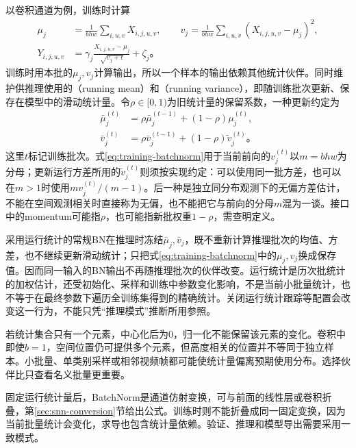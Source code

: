 以卷积通道为例，训练时计算
\begin{equation}
  \begin{aligned}
  \mu_j&=\frac1{bhw}\sum_{i,u,v}X_{i,j,u,v},\qquad
  v_j=\frac1{bhw}\sum_{i,u,v}(X_{i,j,u,v}-\mu_j)^2,\\
  Y_{i,j,u,v}&=\gamma_j\frac{X_{i,j,u,v}-\mu_j}{\sqrt{v_j+\epsilon}}+\zeta_j\text{。}
  \end{aligned}
  \label{eq:training-batchnorm}
\end{equation}
训练时用本批的$\mu_j,v_j$计算输出，所以一个样本的输出依赖其他统计伙伴。同时维护供推理使用的（running mean）和（running variance），即随训练批次更新、保存在模型中的滑动统计量。令$\rho\in[0,1)$为旧统计量的保留系数，一种更新约定为
\begin{equation}
  \begin{aligned}
    \bar\mu_j^{(t)}&=\rho\bar\mu_j^{(t-1)}+(1-\rho)\mu_j^{(t)},\\
    \bar v_j^{(t)}&=\rho\bar v_j^{(t-1)}+(1-\rho)\widetilde v_j^{(t)}\text{。}
  \end{aligned}
  \label{eq:training-batchnorm-running}
\end{equation}
这里$t$标记训练批次。式\eqref{eq:training-batchnorm}用于当前前向的$v_j^{(t)}$以$m=bhw$为分母；更新运行方差所用的$\widetilde v_j^{(t)}$则须按实现约定：可以使用同一批方差，也可以在$m>1$时使用$m v_j^{(t)}/(m-1)$。后一种是独立同分布观测下的无偏方差估计，不能在空间观测相关时直接称为无偏，也不能把它与前向的分母$m$混为一谈。接口中的momentum可能指$\rho$，也可能指新批权重$1-\rho$，需查明定义。

采用运行统计的常规BN在推理时冻结$\bar\mu_j,\bar v_j$，既不重新计算推理批次的均值、方差，也不继续更新滑动统计；只把式\eqref{eq:training-batchnorm}中的$\mu_j,v_j$换成保存值。因而同一输入的BN输出不再随推理批次的伙伴改变。运行统计是历次批统计的加权估计，还受初始化、采样和训练中参数变化影响，不是当前小批量统计，也不等于在最终参数下遍历全训练集得到的精确统计。关闭运行统计跟踪等配置会改变这一行为，不能只凭“推理模式”推断所用参照。

若统计集合只有一个元素，中心化后为0，归一化不能保留该元素的变化。卷积中即使$b=1$，空间位置仍可提供多个元素，但高度相关的位置并不等同于独立样本。小批量、单类别采样或相邻视频帧都可能使统计量偏离预期使用分布。选择伙伴比只查看名义批量更重要。

固定运行统计量后，BatchNorm是通道仿射变换，可与前面的线性层或卷积折叠，第\ref{sec:snn-conversion}节给出公式。训练时则不能折叠成同一固定变换，因为当前批量统计会变化，求导也包含统计量依赖。验证、推理和模型导出需要采用一致模式。

